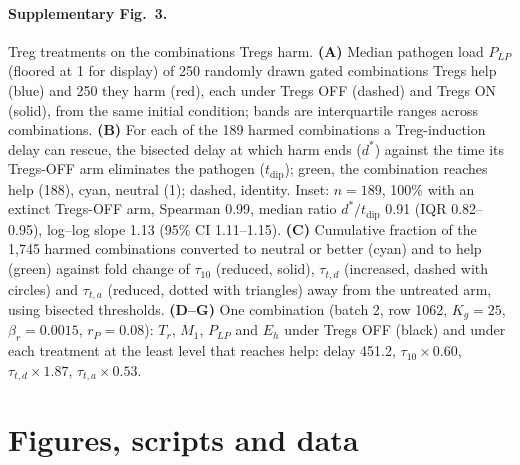 \documentclass[11pt]{article}
\begin{document}
\paragraph{Supplementary Fig.~3.}
Treg treatments on the combinations Tregs harm.
\textbf{(A)} Median pathogen load $P_{LP}$ (floored at 1 for display) of 250
randomly drawn gated combinations Tregs help (blue) and 250 they harm (red),
each under Tregs OFF (dashed) and Tregs ON (solid), from the same initial
condition; bands are interquartile ranges across combinations.
\textbf{(B)} For each of the 189 harmed combinations a Treg-induction delay can
rescue, the bisected delay at which harm ends ($d^\ast$) against the time its
Tregs-OFF arm eliminates the pathogen ($t_{\mathrm{dip}}$); green, the
combination reaches help (188), cyan, neutral (1); dashed, identity. Inset:
$n=189$, 100\% with an extinct Tregs-OFF arm, Spearman 0.99, median ratio
$d^\ast/t_{\mathrm{dip}}$ 0.91 (IQR 0.82--0.95), log--log slope 1.13 (95\% CI
1.11--1.15).
\textbf{(C)} Cumulative fraction of the 1,745 harmed combinations converted to
neutral or better (cyan) and to help (green) against fold change of
$\tau_{10}$ (reduced, solid), $\tau_{t,d}$ (increased, dashed with circles) and
$\tau_{t,a}$ (reduced, dotted with triangles) away from the untreated arm, using
bisected thresholds.
\textbf{(D--G)} One combination (batch 2, row 1062, $K_g=25$,
$\beta_r=0.0015$, $r_P=0.08$): $T_r$, $M_1$, $P_{LP}$ and $E_h$
under Tregs OFF (black) and under each treatment at the least level that
reaches help: delay 451.2, $\tau_{10}\times0.60$, $\tau_{t,d}\times1.87$,
$\tau_{t,a}\times0.53$.

\section{Figures, scripts and data}
\label{sec:fig-script-data}
\end{document}
